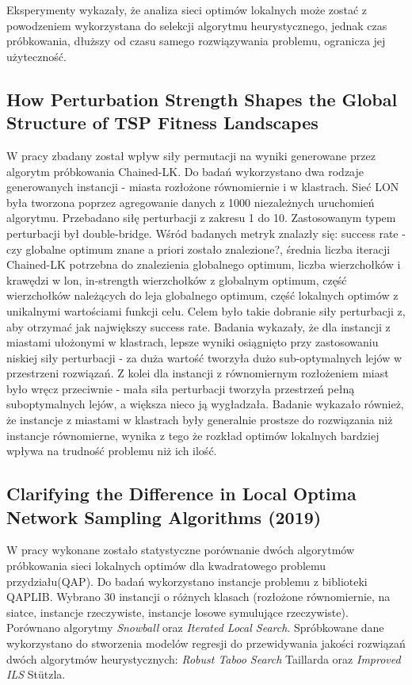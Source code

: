 Eksperymenty wykazały, że analiza sieci optimów lokalnych może zostać z powodzeniem wykorzystana do
selekcji algorytmu heurystycznego, jednak czas próbkowania, dłuższy od czasu samego rozwiązywania problemu,
ogranicza jej użyteczność.

\subsection*{How Perturbation Strength Shapes the Global Structure of TSP Fitness Landscapes\cite{DBLP:conf/evoW/McMenemyVO18}}
W pracy zbadany został wpływ siły permutacji na wyniki generowane przez algorytm próbkowania Chained-LK.
Do badań wykorzystano dwa rodzaje generowanych instancji - miasta rozłożone równomiernie i w klastrach.
Sieć LON była tworzona poprzez agregowanie danych z 1000 niezależnych uruchomień algorytmu.
Przebadano siłę perturbacji z zakresu 1 do 10. Zastosowanym typem perturbacji był double-bridge.
Wśród badanych metryk znalazły się: success rate - czy globalne optimum znane a priori zostało znalezione?,
średnia liczba iteracji Chained-LK potrzebna do znalezienia globalnego optimum, liczba wierzchołków i krawędzi w lon,
in-strength wierzchołków z globalnym optimum, część wierzchołków należących do leja  globalnego optimum,
część lokalnych optimów z unikalnymi wartościami funkcji celu.
Celem było takie dobranie siły perturbacji z, aby otrzymać jak największy success rate.
Badania wykazały, że dla instancji z miastami ułożonymi w klastrach, lepsze wyniki osiągnięto przy zastosowaniu niskiej siły perturbacji
- za duża wartość tworzyła dużo sub-optymalnych lejów w przestrzeni rozwiązań.
Z kolei dla instancji z równomiernym rozłożeniem miast było wręcz przeciwnie - mała siła perturbacji tworzyła przestrzeń pełną
suboptymalnych lejów, a większa nieco ją wygładzała.
Badanie wykazało również, że instancje z miastami w klastrach były generalnie prostsze do rozwiązania niż instancje równomierne,
wynika z tego że rozkład optimów lokalnych bardziej wpływa na trudność problemu niż ich ilość.

\subsection*{Clarifying the Difference in Local Optima Network Sampling Algorithms (2019) \cite{DBLP:conf/evoW/ThomsonOV19}}
W pracy wykonane zostało statystyczne porównanie dwóch algorytmów próbkowania
sieci lokalnych optimów dla kwadratowego problemu przydziału(QAP).
Do badań wykorzystano instancje problemu z biblioteki QAPLIB.
Wybrano 30 instancji o różnych klasach (rozłożone równomiernie, na siatce,
instancje rzeczywiste, instancje losowe symulujące rzeczywiste).
Porównano algorytmy \textit{Snowball} oraz \textit{Iterated Local Search}.
Spróbkowane dane wykorzystano do stworzenia modelów regresji do przewidywania jakości rozwiązań
dwóch algorytmów heurystycznych: \textit{Robust Taboo Search} Taillarda oraz \textit{Improved ILS} Stützla.

